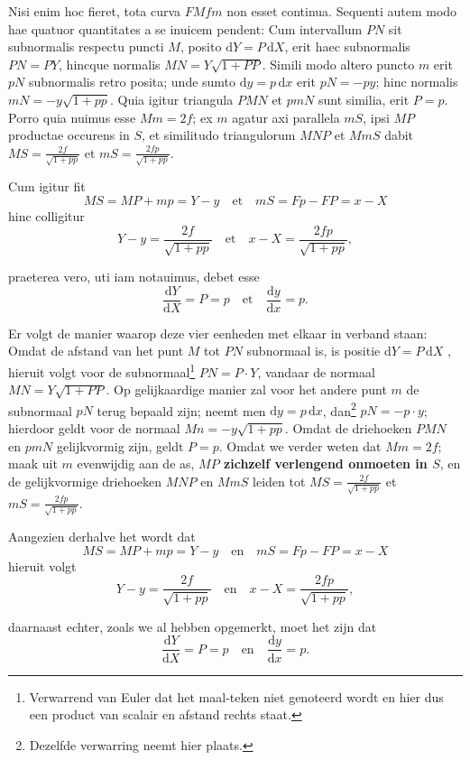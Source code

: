 \documentclass[10pt,a4paper]{article}
\def\D{\mathrm{d}}
\begin{document}
\begin{paracol}{2}
\begin{enumerate}[topsep=1px]
		\par Nisi enim hoc fieret, tota curva $FMfm$ non esset continua. Sequenti autem modo hae quatuor quantitates a se inuicem pendent: Cum intervallum $PN$ sit subnormalis respectu puncti $M$, posito $\D Y = P \,\D X$, erit haec subnormalis $PN=PY$, hincque normalis $MN=Y\sqrt{1+PP}$. Simili modo  altero puncto $m$ erit $pN$ subnormalis retro posita; unde sumto $\D y=p\,\D x$ erit $pN = -py$; hinc normalis $mN = -y\sqrt{1+pp}$. Quia igitur triangula $PMN$ et $pmN$ sunt similia, erit $P=p$. Porro quia nuimus esse $Mm=2f$; ex $m$ agatur axi parallela $mS$, ipsi $MP$ productae occurens in $S$, et similitudo triangulorum $MNP$ et $MmS$ dabit $MS = \frac{2f}{\sqrt{1+pp}}$ et $mS = \frac{2fp}{\sqrt{1+pp}}$.
		\par Cum igitur fit
		\[
			MS = MP + mp = Y-y  \quad \text{et} \quad mS = Fp-FP = x-X
		\]
		hinc colligitur
		\[
			Y-y = \frac{2f}{\sqrt{1+pp}} \quad \text{et}\quad x-X = \frac{2fp}{\sqrt{1+pp}},
		\]
		
		\par praeterea vero, uti iam notauimus, debet esse
		\[
			\frac{\D Y}{\D X} = P = p \quad \text{et} \quad \frac{\D y}{\D x} = p.
		\]
		
		\switchcolumn
		
		\par Er volgt de manier waarop deze vier eenheden met elkaar in verband staan: Omdat de afstand van het punt $M$ tot $PN$ subnormaal is, is positie $\D Y = P \,\D X$ , hieruit volgt voor de subnormaal\footnote{Verwarrend van Euler dat het maal-teken niet genoteerd wordt en hier dus een product van scalair en afstand rechts staat.} $PN = P\cdot Y$,  vandaar de normaal $MN = Y\sqrt{1+PP}$. Op gelijkaardige manier zal voor het andere punt $m$ de subnormaal $pN$ terug bepaald zijn; neemt men $\D y = p \, \D x$, dan\footnote{Dezelfde verwarring neemt hier plaats.} $pN=-p\cdot y$; hierdoor geldt voor de normaal $Mn=-y\sqrt{1+pp}$. Omdat de driehoeken $PMN$ en $pmN$ gelijkvormig zijn, geldt $P=p$. Omdat we verder weten dat $Mm=2f$; maak uit $m$ evenwijdig aan de as, \textbf{$MP$ zichzelf verlengend onmoeten in $S$}, en de gelijkvormige driehoeken $MNP$ en $MmS$ leiden tot $MS = \frac{2f}{\sqrt{1+pp}}$ et $mS = \frac{2fp}{\sqrt{1+pp}}$.
		\par Aangezien derhalve het wordt dat
		\[
			MS = MP + mp = Y-y  \quad \text{en} \quad mS = Fp-FP = x-X
		\]
		hieruit volgt
		\[
			Y-y = \frac{2f}{\sqrt{1+pp}} \quad \text{en}\quad x-X = \frac{2fp}{\sqrt{1+pp}},
		\]
		\par daarnaast echter, zoals we al hebben opgemerkt, moet het zijn dat
		\[
			\frac{\D Y}{\D X} = P = p \quad \text{en} \quad \frac{\D y}{\D x} = p.
		\]
				

\end{enumerate}
\end{paracol}
\end{document}
